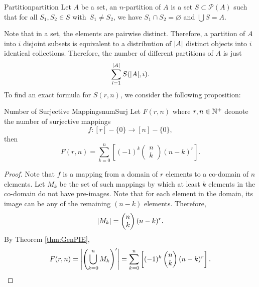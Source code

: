 \documentclass[math]{amznotes}
\theoremstyle{remark}
\newcommand{\0}{\mathbf{0}}
\newcommand{\1}{\mathbf{1}}
\begin{document}
\begin{dfnbox}{Partition}{partition}
    Let $A$ be a set, an $n$-partition of $A$ is a set $S \subset \mathcal{P}(A)$ such that for all $S_1, S_2 \in S$ with~$S_1 \neq S_2$, we have $S_1 \cap S_2 = \varnothing$ and $\bigcup S = A$.
\end{dfnbox}
Note that in a set, the elements are pairwise distinct. Therefore, a partition of $A$ into $i$ disjoint subsets is equivalent to a distribution of ${\left\lvert {A} \right\rvert}$ distinct objects into $i$ identical collections. Therefore, the number of different partitions of $A$ is just
\begin{equation*}
    \sum_{i = 1}^{{\left\lvert {A} \right\rvert}}S({\left\lvert {A} \right\rvert}, i).
\end{equation*}
To find an exact formula for $S(r, n)$, we consider the following proposition:
\begin{probox}{Number of Surjective Mappings}{numSurj}
    Let $F(r, n)$ where $r, n \in \mathbb{N}^+$ deonote the number of surjective mappings
    \begin{equation*}
        f \colon [r] - \{0\} \to [n] - \{0\},
    \end{equation*}
    then
    \begin{equation*}
        F(r, n) = \sum_{k = 0}^{n}\left[(-1)^k \begin{pmatrix}
            n \\
            k
        \end{pmatrix}(n - k)^r\right].
    \end{equation*}
    \tcblower
    \begin{proof}
        Note that $f$ is a mapping from a domain of $r$ elements to a co-domain of $n$ elements. Let $M_k$ be the set of such mappings by which at least $k$ elements in the co-domain do not have pre-images. Note that for each element in the domain, its image can be any of the remaining $(n - k)$ elements. Therefore, 
        \begin{equation*}
            {\left\lvert {M_k} \right\rvert} = \begin{pmatrix}
                n \\
                k
            \end{pmatrix}(n - k)^r.
        \end{equation*}
        By Theorem \ref{thm:GenPIE}, 
        \begin{equation*}
            F(r, n) = {\left\lvert {\left(\bigcup_{k = 0}^nM_k\right)'} \right\rvert} = \sum_{k = 0}^{n}\left[(-1)^k \begin{pmatrix}
                n \\
                k
            \end{pmatrix}(n - k)^r\right].
        \end{equation*}
    \end{proof}
\end{probox}
\end{document}
